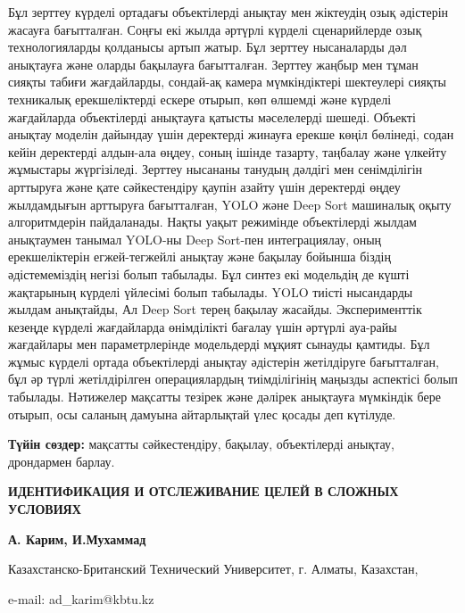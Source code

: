 Бұл зерттеу күрделі ортадағы объектілерді анықтау мен жіктеудің озық
әдістерін жасауға бағытталған. Соңғы екі жылда әртүрлі күрделі
сценарийлерде озық технологияларды қолданысы артып жатыр. Бұл зерттеу
нысаналарды дәл анықтауға және оларды бақылауға бағытталған. Зерттеу
жаңбыр мен тұман сияқты табиғи жағдайларды, сондай-ақ камера
мүмкіндіктері шектеулері сияқты техникалық ерекшеліктерді ескере отырып,
көп өлшемді және күрделі жағдайларда объектілерді анықтауға қатысты
мәселелерді шешеді. Объекті анықтау моделін дайындау үшін деректерді
жинауға ерекше көңіл бөлінеді, содан кейін деректерді алдын-ала өңдеу,
соның ішінде тазарту, таңбалау және үлкейту жұмыстары жүргізіледі.
Зерттеу нысананы танудың дәлдігі мен сенімділігін арттыруға және қате
сәйкестендіру қаупін азайту үшін деректерді өңдеу жылдамдығын арттыруға
бағытталған, YOLO және Deep Sort машиналық оқыту алгоритмдерін
пайдаланады. Нақты уақыт режимінде объектілерді жылдам анықтаумен
танымал YOLO-ны Deep Sort-пен интеграциялау, оның ерекшеліктерін
егжей-тегжейлі анықтау және бақылау бойынша біздің әдістемеміздің негізі
болып табылады. Бұл синтез екі модельдің де күшті жақтарының күрделі
үйлесімі болып табылады. YOLO тиісті нысандарды жылдам анықтайды, Ал
Deep Sort терең бақылау жасайды. Эксперименттік кезеңде күрделі
жағдайларда өнімділікті бағалау үшін әртүрлі ауа-райы жағдайлары мен
параметрлерінде модельдерді мұқият сынауды қамтиды. Бұл жұмыс күрделі
ортада объектілерді анықтау әдістерін жетілдіруге бағытталған, бұл әр
түрлі жетілдірілген операциялардың тиімділігінің маңызды аспектісі болып
табылады. Нәтижелер мақсатты тезірек және дәлірек анықтауға мүмкіндік
бере отырып, осы саланың дамуына айтарлықтай үлес қосады деп күтілуде.

{\bfseries Түйін сөздер:} мақсатты сәйкестендіру, бақылау, объектілерді
анықтау, дрондармен барлау.

\begin{center}
{\large\bfseries ИДЕНТИФИКАЦИЯ И ОТСЛЕЖИВАНИЕ ЦЕЛЕЙ В СЛОЖНЫХ УСЛОВИЯХ}

{\bfseries А. Карим, И.Мухаммад}

Казахстанско-Британский Технический Университет, г. Алматы, Казахстан,

e-mail: ad\_karim@kbtu.kz
\end{center}

